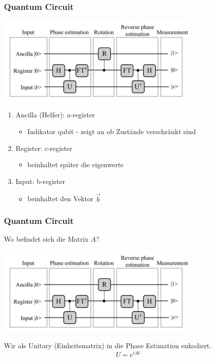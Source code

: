     \begin{frame}
    \frametitle{Quantum Circuit}
    \begin{center}
    \includegraphics[width=10cm]{img/hhl_circuit.jpg}
    \end{center}

    \begin{enumerate}
        \item Ancilla (Helfer): a-register
        \begin{itemize}
            \item Indikator qubit - zeigt an ob Zustände verschränkt sind
        \end{itemize}

        \item Register: c-register
        \begin{itemize}
            \item beinhaltet später die eigenwerte
        \end{itemize}
        
        \item Input: b-register 
        \begin{itemize}
            \item beinhaltet den Vektor $\vec{b}$
        \end{itemize}
        
    \end{enumerate}
   \end{frame}

\begin{frame}
    \frametitle{Quantum Circuit}
    \hfil

    Wo befindet sich die Matrix $A$?
    \begin{center}
    \includegraphics[width=10cm]{img/hhl_circuit.jpg}
    \end{center}

    \hfil
    Wir als Unitary (Einheitsmatrix) in die Phase Estimation enkodiert.
    $$U = e^{iAt}$$
\end{frame}

